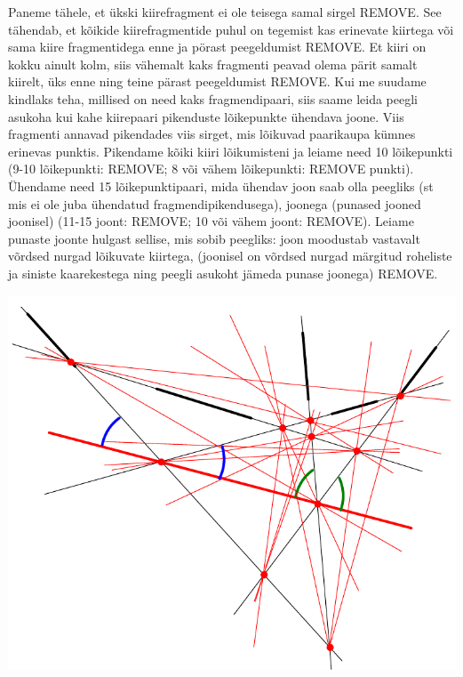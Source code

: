 \documentclass[10pt]{article}
\newcommand{\pp}[1]{REMOVE}
\begin{document}
\solu
Paneme tähele, et ükski kiirefragment ei ole teisega samal sirgel \pp{1}. See tähendab, et kõikide kiirefragmentide puhul on tegemist kas erinevate kiirtega või sama kiire fragmentidega enne ja pörast peegeldumist \pp{1}. Et kiiri on kokku ainult kolm, siis vähemalt kaks fragmenti peavad olema pärit samalt kiirelt, üks enne ning teine pärast peegeldumist \pp{1}. Kui me suudame kindlaks teha, millised on need kaks fragmendipaari, siis saame leida peegli asukoha kui kahe kiirepaari pikenduste lõikepunkte ühendava joone. Viis fragmenti annavad pikendades viis sirget, mis lõikuvad paarikaupa kümnes erinevas punktis. Pikendame kõiki kiiri lõikumisteni ja leiame need 10 lõikepunkti (9-10 lõikepunkti: \pp{1}; 8 või vähem lõikepunkti: \pp{0} punkti). Ühendame need 15 lõikepunktipaari, mida ühendav joon saab olla peegliks (st mis ei ole juba ühendatud fragmendipikendusega), joonega (punased jooned joonisel) (11-15 joont: \pp{1}; 10 või vähem joont: \pp{0}). Leiame punaste joonte hulgast sellise, mis sobib peegliks: joon moodustab vastavalt võrdsed nurgad lõikuvate kiirtega, (joonisel on võrdsed nurgad märgitud roheliste ja siniste kaarekestega ning peegli asukoht jämeda punase joonega) \pp{1}. 
\begin{center}
\includegraphics[scale=0.7]{2019-v2g-02-yl.pdf}
\end{center}
\probend
\bigskip

\setAuthor{}
\end{document}
